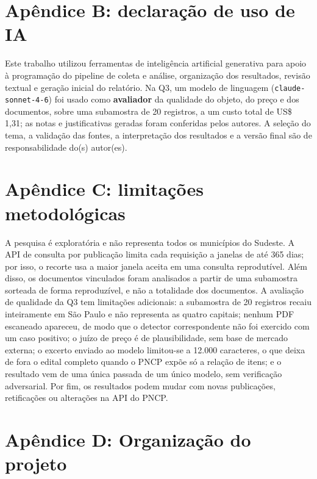 \documentclass[12pt]{article}
\begin{document}
\section{Apêndice B: declaração de uso de
IA}\label{apuxeandice-b-declarauxe7uxe3o-de-uso-de-ia}

Este trabalho utilizou ferramentas de inteligência artificial generativa
para apoio à programação do pipeline de coleta e análise, organização
dos resultados, revisão textual e geração inicial do relatório. Na Q3, um
modelo de linguagem (\texttt{claude-sonnet-4-6}) foi usado como
\textbf{avaliador} da qualidade do objeto, do preço e dos documentos,
sobre uma subamostra de 20 registros, a um custo total de US\$ 1,31; as
notas e justificativas geradas foram conferidas pelos autores. A seleção
do tema, a validação das fontes, a interpretação dos resultados e a
versão final são de responsabilidade do(s) autor(es).

\section{Apêndice C: limitações
metodológicas}\label{apuxeandice-c-limitauxe7uxf5es-metodoluxf3gicas}

A pesquisa é exploratória e não representa todos os municípios do
Sudeste. A API de consulta por publicação limita cada requisição a
janelas de até 365 dias; por isso, o recorte usa a maior janela aceita
em uma consulta reprodutível. Além disso, os documentos vinculados foram
analisados a partir de uma subamostra sorteada de forma reproduzível, e
não a totalidade dos documentos. A avaliação de qualidade da Q3 tem
limitações adicionais: a subamostra de 20 registros recaiu inteiramente
em São Paulo e não representa as quatro capitais; nenhum PDF escaneado
apareceu, de modo que o detector correspondente não foi exercido com um
caso positivo; o juízo de preço é de plausibilidade, sem base de mercado
externa; o excerto enviado ao modelo limitou-se a 12.000 caracteres, o
que deixa de fora o edital completo quando o PNCP expõe só a relação de
itens; e o resultado vem de uma única passada de um único modelo, sem
verificação adversarial. Por fim, os resultados podem mudar com novas
publicações, retificações ou alterações na API do PNCP.

\section{Apêndice D: Organização do
projeto}\label{apuxeandice-d-organizauxe7uxe3o-do-projeto}
\end{document}
